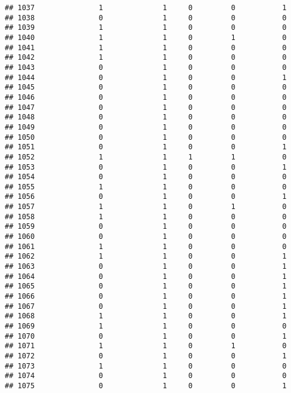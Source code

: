 \documentclass[]{article}
\begin{document}
\begin{verbatim}
## 1037               1              1     0         0           1
## 1038               0              1     0         0           0
## 1039               1              1     0         0           0
## 1040               1              1     0         1           0
## 1041               1              1     0         0           0
## 1042               1              1     0         0           0
## 1043               0              1     0         0           0
## 1044               0              1     0         0           1
## 1045               0              1     0         0           0
## 1046               0              1     0         0           0
## 1047               0              1     0         0           0
## 1048               0              1     0         0           0
## 1049               0              1     0         0           0
## 1050               0              1     0         0           0
## 1051               0              1     0         0           1
## 1052               1              1     1         1           0
## 1053               0              1     0         0           1
## 1054               0              1     0         0           0
## 1055               1              1     0         0           0
## 1056               0              1     0         0           1
## 1057               1              1     0         1           0
## 1058               1              1     0         0           0
## 1059               0              1     0         0           0
## 1060               0              1     0         0           0
## 1061               1              1     0         0           0
## 1062               1              1     0         0           1
## 1063               0              1     0         0           1
## 1064               0              1     0         0           1
## 1065               0              1     0         0           1
## 1066               0              1     0         0           1
## 1067               0              1     0         0           1
## 1068               1              1     0         0           1
## 1069               1              1     0         0           0
## 1070               0              1     0         0           1
## 1071               1              1     0         1           0
## 1072               0              1     0         0           1
## 1073               1              1     0         0           0
## 1074               0              1     0         0           0
## 1075               0              1     0         0           1

\end{verbatim}
\end{document}
